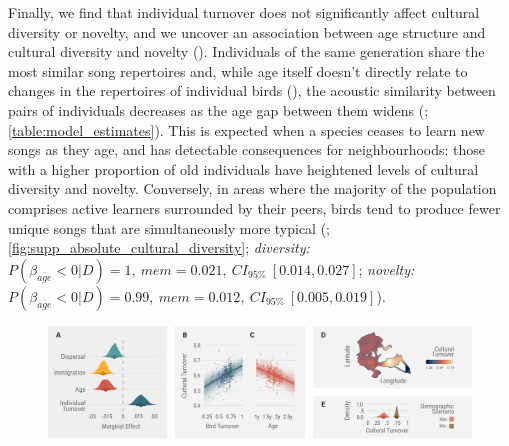 \documentclass[9pt, twocolumn, twoside]{gsajnl}
\begin{document}
Finally, we find that individual turnover does not significantly affect cultural diversity or novelty, and we uncover an association between age structure and cultural diversity and novelty (). Individuals of the same generation share the most similar song repertoires and, while age itself doesn't directly relate to changes in the repertoires of individual birds (), the acoustic similarity between pairs of individuals decreases as the age gap between them widens (; \autoref{table:model_estimates}). This is expected when a species ceases to learn new songs as they age, and has detectable consequences for neighbourhoods: those with a higher proportion of old individuals have heightened levels of cultural diversity and novelty. Conversely, in areas where the majority of the population comprises active learners surrounded by their peers, birds tend to produce fewer unique songs that are simultaneously more typical (; \autoref{fig:supp_absolute_cultural_diversity}; \textit{diversity:} $P(\beta_{\overline{age}} < 0 | D) = 1,~mem=0.021,~CI_{95\%}~[0.014, 0.027]$; \textit{novelty:} $P(\beta_{\overline{age}} < 0 | D) = 0.99,~mem=0.012,~CI_{95\%}~[0.005, 0.019]$).

\begin{figure}[!htb]
    \centering
    \includegraphics[width=\linewidth]{figures/chapter_4/FIG4.pdf}
    \label{c4_fig:turnover}
\end{figure}
\end{document}
